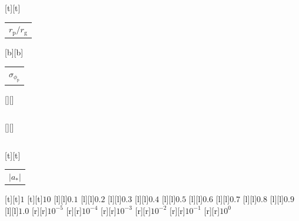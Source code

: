 %    
%
%
\begin{psfrags}%
\psfragscanon%
%
[t][t]{\color[rgb]{0,0,0}\setlength{\tabcolsep}{0pt}\begin{tabular}{c}{\Large$r_\mathrm{p}/r_\mathrm{g}$}\end{tabular}}%
[b][b]{\color[rgb]{0,0,0}\setlength{\tabcolsep}{0pt}\begin{tabular}{c}{\Large$\sigma_{\phi_\mathrm{p}}$}\end{tabular}}%
[][]{\color[rgb]{0,0,0}\setlength{\tabcolsep}{0pt}\begin{tabular}{c} \end{tabular}}%
[][]{\color[rgb]{0,0,0}\setlength{\tabcolsep}{0pt}\begin{tabular}{c} \end{tabular}}%
[t][t]{\color[rgb]{0,0,0}\setlength{\tabcolsep}{0pt}\begin{tabular}{c}{\Large$\left|a_\ast\right|$}\end{tabular}}%
%
[t][t]{$1$}%
[t][t]{$10$}%
%
[l][l]{$0.1$}%
[l][l]{$0.2$}%
[l][l]{$0.3$}%
[l][l]{$0.4$}%
[l][l]{$0.5$}%
[l][l]{$0.6$}%
[l][l]{$0.7$}%
[l][l]{$0.8$}%
[l][l]{$0.9$}%
[l][l]{$1.0$}%
[r][r]{$10^{-5}$}%
[r][r]{$10^{-4}$}%
[r][r]{$10^{-3}$}%
[r][r]{$10^{-2}$}%
[r][r]{$10^{-1}$}%
[r][r]{$10^{0}$}%
%
%
\end{psfrags}%
%
